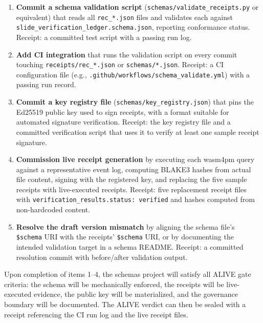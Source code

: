 \begin{enumerate}
  \item \textbf{Commit a schema validation script} (\texttt{schemas/validate\_receipts.py} or
    equivalent) that reads all \texttt{rec\_*.json} files and validates each against
    \texttt{slide\_verification\_ledger.schema.json}, reporting conformance status.
    Receipt: a committed test script with a passing run log.
  \item \textbf{Add CI integration} that runs the validation script on every commit touching
    \texttt{receipts/rec\_*.json} or \texttt{schemas/*.json}.
    Receipt: a CI configuration file (e.g., \texttt{.github/workflows/schema\_validate.yml})
    with a passing run record.
  \item \textbf{Commit a key registry file} (\texttt{schemas/key\_registry.json}) that pins the
    Ed25519 public key used to sign receipts, with a format suitable for automated signature
    verification.
    Receipt: the key registry file and a committed verification script that uses it to verify
    at least one sample receipt signature.
  \item \textbf{Commission live receipt generation} by executing each wasm4pm query against a
    representative event log, computing BLAKE3 hashes from actual file content, signing with
    the registered key, and replacing the five sample receipts with live-executed receipts.
    Receipt: five replacement receipt files with \texttt{verification\_results.status: verified}
    and hashes computed from non-hardcoded content.
  \item \textbf{Resolve the draft version mismatch} by aligning the schema file's
    \texttt{\$schema} URI with the receipts' \texttt{\$schema} URI, or by documenting the
    intended validation target in a schema README.
    Receipt: a committed resolution commit with before/after validation output.
\end{enumerate}

Upon completion of items 1--4, the schemas project will satisfy all ALIVE gate criteria: the
schema will be mechanically enforced, the receipts will be live-executed evidence, the public
key will be materialized, and the governance boundary will be documented. The ALIVE verdict
can then be sealed with a receipt referencing the CI run log and the live receipt files.

